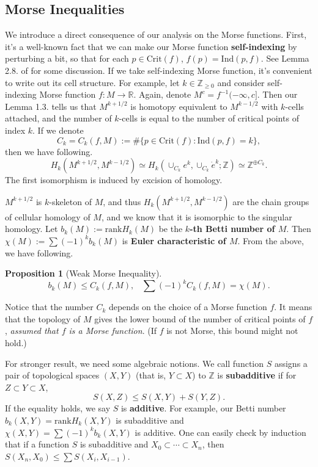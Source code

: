 \documentclass{article}
\newtheorem{proposition}[theorem]{Proposition}
\newcommand{\Z}{\mathbb{Z}}
\newcommand{\R}{\mathbb{R}}
\newcommand{\Crit}{\mathrm{Crit}}
\newcommand{\Ind}{\mathrm{Ind}}
\begin{document}
\subsection{Morse Inequalities}

We introduce a direct consequence of our analysis on the Morse functions.
First, it's a well-known fact that we can make our Morse function \textbf{self-indexing} by perturbing a bit, so that for each $p\in\Crit(f)$, $f(p)=\Ind(p,f)$.
See Lemma 2.8. of \cite{m2} for some discussion.
If we take self-indexing Morse function, it's convenient to write out its cell structure.
For example, let $k\in\Z_{\geq0}$ and consider self-indexing Morse function $f:M\to\R$.
Again, denote $M^c=f^{-1}(-\infty,c]$.
Then our Lemma 1.3. tells us that $M^{k+1/2}$ is homotopy equivalent to $M^{k-1/2}$ with $k$-cells attached, and the number of $k$-cells is equal to the number of critical points of index $k$.
If we denote
	$$C_k=C_k(f,M):=\#\{p\in\Crit(f):\Ind(p,f)=k\},$$
then we have following.
	$$H_k(M^{k+1/2},M^{k-1/2})\simeq H_k(\cup_{C_k} e^k,\cup_{C_k}\dot{e}^k;\Z)\simeq\Z^{\oplus C_k}.$$
The first isomorphism is induced by excision of homology.

$M^{k+1/2}$ is $k$-skeleton of $M$, and thus $H_k(M^{k+1/2},M^{k-1/2})$ are the chain groups of cellular homology of $M$, and we know that it is isomorphic to the singular homology.
Let $b_k(M):=\mathrm{rank}H_k(M)$ be the \textbf{$k$-th Betti number of $M$}.
Then $\chi(M):=\sum(-1)^kb_k(M)$ is \textbf{Euler characteristic of $M$}.
From the above, we have following.
	\begin{proposition}[Weak Morse Inequality]\rm
	$$b_k(M)\leq C_k(f,M),\,\,\,\,\,\sum (-1)^kC_k(f,M)=\chi(M).$$
	\end{proposition}
Notice that the number $C_k$ depends on the choice of a Morse function $f$.
It means that the topology of $M$ gives the lower bound of the number of critical points of $f$, \emph{assumed that $f$ is a Morse function}.
(If $f$ is not Morse, this bound might not hold.)

For stronger result, we need some algebraic notions.
We call function $S$ assigns a pair of topological spaces $(X,Y)$ (that is, $Y\subset X$) to $\Z$ is \textbf{subadditive} if for $Z\subset Y\subset X$,
	$$S(X,Z)\leq S(X,Y)+S(Y,Z).$$
If the equality holds, we say $S$ is \textbf{additive}.
For example, our Betti number $b_k(X,Y)=\mathrm{rank}H_k(X,Y)$ is subadditive and $\chi(X,Y)=\sum(-1)^kb_k(X,Y)$ is additive.
One can easily check by induction that if a function $S$ is subadditive and $X_0\subset\cdots\subset X_n$, then $S(X_n,X_0)\leq\sum S(X_i,X_{i-1})$.
\end{document}
